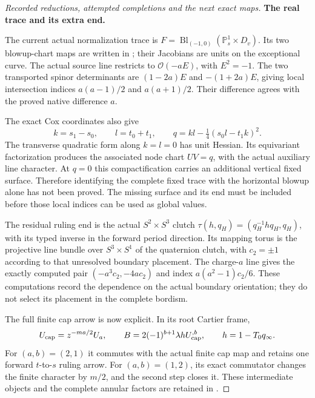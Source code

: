 \begin{proof}[Recorded reductions, attempted completions and the next exact maps]
\par\medskip\noindent\textbf{The real trace and its extra end.}\par\nopagebreak[4]
The current actual normalization trace is
\(F=\operatorname{Bl}_{(-1,0)}(\mathbb P^1_s\times D_v)\).
Its two blowup-chart maps are written in
; their
Jacobians are units on the exceptional curve. The actual
source line restricts to \(\mathcal O(-aE)\), with
\(E^2=-1\). The two transported spinor determinants are
\((1-2a)E\) and \(-(1+2a)E\), giving local intersection
indices \(a(a-1)/2\) and \(a(a+1)/2\). Their difference
agrees with the proved native difference \(a\).

The exact Cox coordinates also give
\[
 k=s_1-s_0,\qquad l=t_0+t_1,\qquad
 q=kl-\tfrac14(s_0l-t_1k)^2.
\]
The transverse quadratic form along \(k=l=0\) has unit
Hessian. Its equivariant factorization produces the associated
node chart \(UV=q\), with the actual auxiliary line character.
At \(q=0\) this compactification carries an additional
vertical fixed surface. Therefore identifying the complete
fixed trace with the horizontal blowup alone has not been
proved. The missing surface and its end must be included
before those local indices can be used as global values.

The residual ruling end is the actual
\(S^2\times S^3\) clutch
\(\tau(h,q_H)=(q_H^{-1}h q_H,q_H)\), with its typed inverse
in the forward period direction. Its mapping torus is the
projective line bundle over \(S^3\times S^1\) of the
quaternion clutch, with \(c_2=\pm1\) according to that
unresolved boundary placement. The charge-\(a\) line gives
the exactly computed pair \((-a^3c_2,-4ac_2)\) and index
\(a(a^2-1)c_2/6\). These computations record the dependence
on the actual boundary orientation; they do not select its
placement in the complete bordism.

The full finite cap arrow is now explicit. In its root
Cartier frame,
\[
 U_{\rm cap}=z^{-ma/2}U_a,\qquad
 B=2(-1)^{b+1}\lambda h U_{\rm cap}^{,b},\qquad
 h=1-T_0q_\infty.
\]
For \((a,b)=(2,1)\) it commutes with the actual finite cap
map and retains one forward \(t\)-to-\(s\) ruling arrow.
For \((a,b)=(1,2)\), its exact commutator changes the finite
character by \(m/2\), and the second step closes it. These
intermediate objects and the complete annular factors are
retained in
.


\end{proof}
